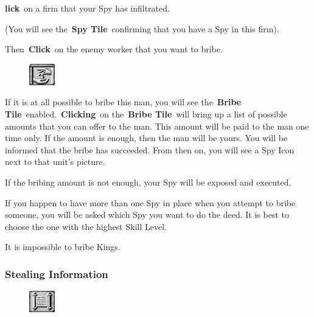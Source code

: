 \textbf{lick} on a firm that your Spy has infiltrated.

(You will see the \textbf{Spy Tile} confirming that you have a Spy in this firm).

Then \textbf{Click} on the enemy worker that you want to bribe.

\begin{figure}
	\vspace{-20pt}
	\begin{center}
		\includegraphics[width=0.1\textwidth]{Tbribe}
	\end{center}
	\vspace{-20pt}
\end{figure}

If it is at all possible to bribe this man, you will see the \textbf{Bribe Tile} enabled. \textbf{Clicking} on the \textbf{Bribe Tile} will bring up a list of possible amounts that you can offer to the man. This amount will be paid to the man one time only. If the amount is enough, then the man will be yours. You will be informed that the bribe has succeeded. From then on, you will see a Spy Icon next to that unit’s picture.

If the bribing amount is not enough, your Spy will be exposed and executed.

If you happen to have more than one Spy in place when you attempt to bribe someone, you will be asked which Spy you want to do the deed. It is best to choose the one with the highest Skill Level.

It is impossible to bribe Kings.

\subsubsection{Stealing Information}


\begin{figure}
	\vspace{-20pt}
	\begin{center}
		\includegraphics[width=0.1\textwidth]{Tsteal}
	\end{center}
	\vspace{-20pt}
\end{figure}

